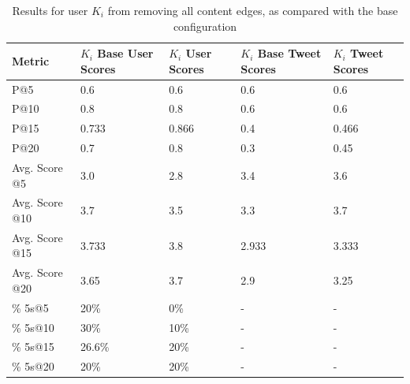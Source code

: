 \begin{table}
\centering
\begin{tabular}{l|p{2.2cm}|p{2.2cm}|p{2.2cm}|p{2.2cm}}
{\bf Metric} & {\bf $K_{i}$ Base User Scores} & {\bf $K_{i}$ User Scores} & {\bf $K_{i}$ Base Tweet Scores} & {\bf $K_{i}$ Tweet Scores} \\ \hline
P@5   & 0.6 & 0.6 & 0.6 & 0.6 \\ \hline
P@10 & 0.8 & 0.8 & 0.6 & 0.6 \\ \hline
P@15 & 0.733 & 0.866 & 0.4 & 0.466 \\ \hline
P@20 & 0.7 & 0.8 & 0.3 & 0.45 \\ \hline

Avg. Score @5   & 3.0 & 2.8 & 3.4 & 3.6 \\ \hline
Avg. Score @10 & 3.7 & 3.5 & 3.3 & 3.7 \\ \hline
Avg. Score @15 & 3.733 & 3.8 & 2.933 & 3.333 \\ \hline
Avg. Score @20 & 3.65 & 3.7 & 2.9 & 3.25 \\ \hline

\% 5s@5    & 20\% & 0\% & - & - \\ \hline
\% 5s@10  & 30\% & 10\% & - & - \\ \hline
\% 5s@15  & 26.6\% & 20\% & - & - \\ \hline
\% 5s@20  & 20\% & 20\% & - & - \\

\end{tabular}
\caption[Results of removing all content edges]{Results for user $K_{i}$ from removing all content edges, as compared with the base configuration}
\label{tab:RemoveContent}
\end{table}



